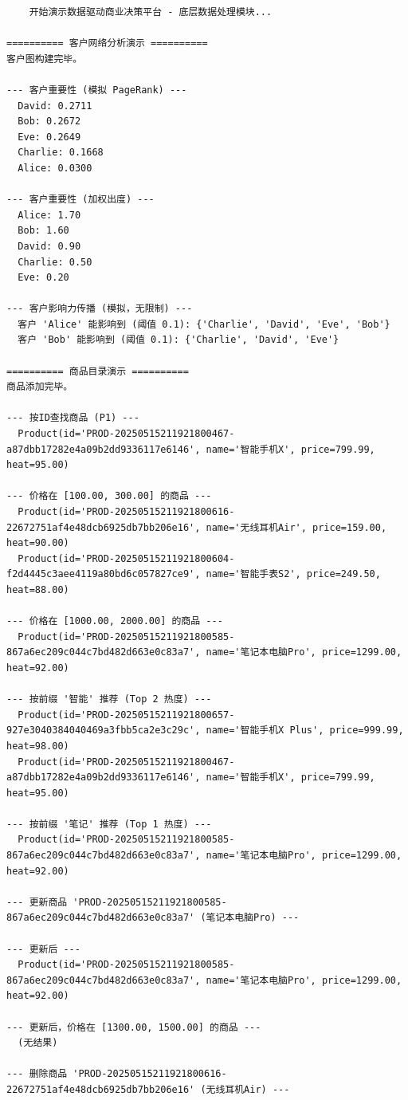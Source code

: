 \documentclass[cn,hazy,blue,10pt,normal]{elegantnote}
\begin{document}
\begin{tiny}
\begin{verbatim}
    开始演示数据驱动商业决策平台 - 底层数据处理模块...

========== 客户网络分析演示 ==========
客户图构建完毕。

--- 客户重要性 (模拟 PageRank) ---
  David: 0.2711
  Bob: 0.2672
  Eve: 0.2649
  Charlie: 0.1668
  Alice: 0.0300

--- 客户重要性 (加权出度) ---
  Alice: 1.70
  Bob: 1.60
  David: 0.90
  Charlie: 0.50
  Eve: 0.20

--- 客户影响力传播 (模拟，无限制) ---
  客户 'Alice' 能影响到 (阈值 0.1): {'Charlie', 'David', 'Eve', 'Bob'}
  客户 'Bob' 能影响到 (阈值 0.1): {'Charlie', 'David', 'Eve'}

========== 商品目录演示 ==========
商品添加完毕。

--- 按ID查找商品 (P1) ---
  Product(id='PROD-20250515211921800467-a87dbb17282e4a09b2dd9336117e6146', name='智能手机X', price=799.99, heat=95.00)

--- 价格在 [100.00, 300.00] 的商品 ---
  Product(id='PROD-20250515211921800616-22672751af4e48dcb6925db7bb206e16', name='无线耳机Air', price=159.00, heat=90.00)
  Product(id='PROD-20250515211921800604-f2d4445c3aee4119a80bd6c057827ce9', name='智能手表S2', price=249.50, heat=88.00)

--- 价格在 [1000.00, 2000.00] 的商品 ---
  Product(id='PROD-20250515211921800585-867a6ec209c044c7bd482d663e0c83a7', name='笔记本电脑Pro', price=1299.00, heat=92.00)

--- 按前缀 '智能' 推荐 (Top 2 热度) ---
  Product(id='PROD-20250515211921800657-927e3040384040469a3fbb5ca2e3c29c', name='智能手机X Plus', price=999.99, heat=98.00)
  Product(id='PROD-20250515211921800467-a87dbb17282e4a09b2dd9336117e6146', name='智能手机X', price=799.99, heat=95.00)

--- 按前缀 '笔记' 推荐 (Top 1 热度) ---
  Product(id='PROD-20250515211921800585-867a6ec209c044c7bd482d663e0c83a7', name='笔记本电脑Pro', price=1299.00, heat=92.00)

--- 更新商品 'PROD-20250515211921800585-867a6ec209c044c7bd482d663e0c83a7' (笔记本电脑Pro) ---

--- 更新后 ---
  Product(id='PROD-20250515211921800585-867a6ec209c044c7bd482d663e0c83a7', name='笔记本电脑Pro', price=1299.00, heat=92.00)

--- 更新后，价格在 [1300.00, 1500.00] 的商品 ---
  (无结果)

--- 删除商品 'PROD-20250515211921800616-22672751af4e48dcb6925db7bb206e16' (无线耳机Air) ---


\end{verbatim}
\end{tiny}
\end{document}
